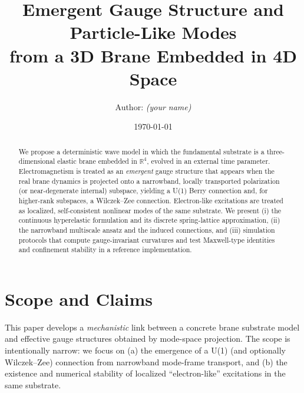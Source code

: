 \documentclass[11pt,a4paper]{article}
\title{Emergent Gauge Structure and Particle-Like Modes\\
from a 3D Brane Embedded in 4D Space}
\author{Author: \textit{(your name)}}
\date{\today}
\begin{document}
\maketitle

\begin{abstract}
We propose a deterministic wave model in which the fundamental substrate is a three-dimensional elastic brane
embedded in $\mathbb{R}^4$, evolved in an external time parameter.
Electromagnetism is treated as an \emph{emergent} gauge structure that appears when the real brane dynamics is
projected onto a narrowband, locally transported polarization (or near-degenerate internal) subspace, yielding
a U(1) Berry connection and, for higher-rank subspaces, a Wilczek--Zee connection.
Electron-like excitations are treated as localized, self-consistent nonlinear modes of the same substrate.
We present (i) the continuous hyperelastic formulation and its discrete spring-lattice approximation,
(ii) the narrowband multiscale ansatz and the induced connections, and
(iii) simulation protocols that compute gauge-invariant curvatures and test Maxwell-type identities and
confinement stability in a reference implementation.
\end{abstract}

\tableofcontents
\newpage

\section{Scope and Claims}
\label{sec:scope}

This paper develops a \emph{mechanistic} link between a concrete brane substrate model and effective gauge
structures obtained by mode-space projection. The scope is intentionally narrow: we focus on (a) the emergence
of a U(1) (and optionally Wilczek--Zee) connection from narrowband mode-frame transport, and (b) the existence
and numerical stability of localized ``electron-like'' excitations in the same substrate.
\end{document}
